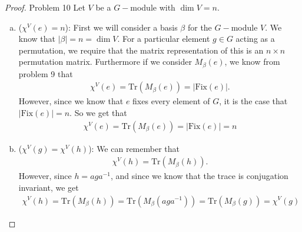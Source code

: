\documentclass[titlepage]{article}
\theoremstyle{plain}
\theoremstyle{definition}
\theoremstyle{remark}
\theoremstyle{exercise-style}
\numberwithin{equation}{section}
\numberwithin{theorem}{section}
\numberwithin{remark}{section}
\begin{document}
\begin{proof}{Problem 10}
    Let $V$ be a $G-$module with $\dim V = n$.
    \begin{enumerate}[(a)]
        \item ($\chi^V(e) = n$): First we will consider a basis $\beta$ for the $G-$module $V$. We know that $|\beta | = n = \dim V$.  For a particular element $g \in G$ acting as a permutation, we require that the matrix representation of this is an $n \times n$ permutation matrix. Furthermore if we consider $M_\beta(e)$, we know from problem 9 that
        \begin{align}
            \chi^{V}(e)= \mathrm{Tr}(M_\beta(e)) = |\mathrm{Fix}(e)|.
        \end{align}
        However, since we know that $e$ fixes every element of $G$, it is the case that $|\mathrm{Fix}(e)|= n$. So we get that
        \begin{align}
            \chi^{V}(e)= \mathrm{Tr}(M_\beta(e)) = |\mathrm{Fix}(e)| = n
        \end{align}
        \item ($\chi^V(g) = \chi^V(h)$): We can remember that
        \begin{align}
            \chi^{V}(h)= \mathrm{Tr}(M_\beta(h)).
        \end{align}
        However, since $h = aga^{-1}$, and since we know that the trace is conjugation invariant, we get
        \begin{align}
            \chi^{V}(h)= \mathrm{Tr}(M_\beta(h)) = \mathrm{Tr}(M_\beta(aga^{-1})) = \mathrm{Tr}(M_\beta(g)) = \chi^{V}(g)
        \end{align}
    \end{enumerate}
\end{proof}
\end{document}
